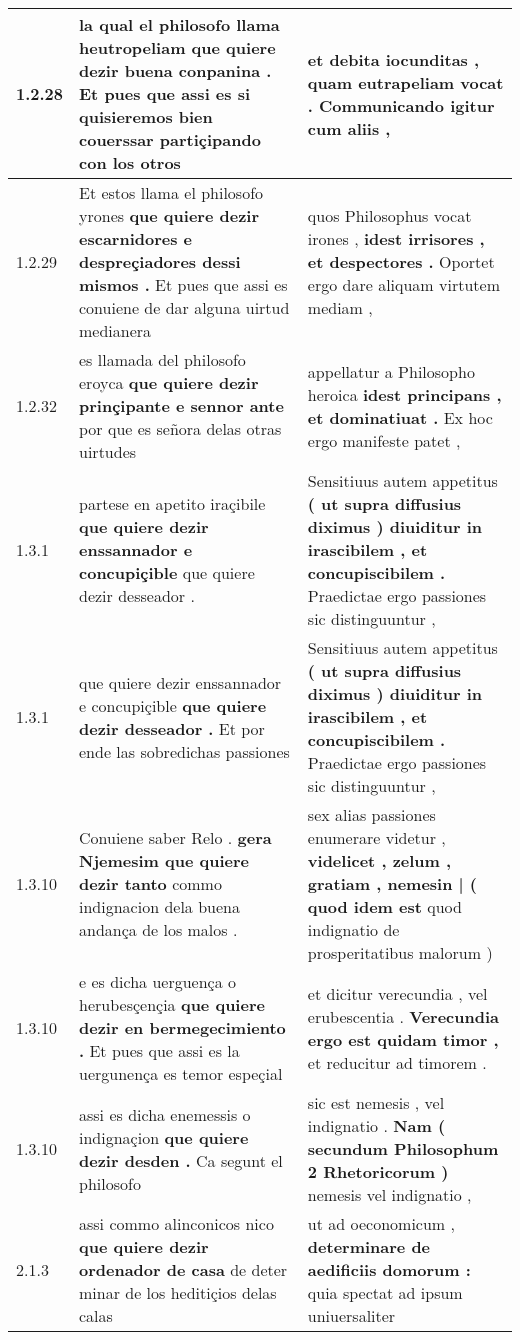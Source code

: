 \begin{tabular}{|p{1cm}|p{6.5cm}|p{6.5cm}|}
1.2.28 & la qual el philosofo llama heutropeliam \textbf{ que quiere dezir buena conpanina . } Et pues que assi es si quisieremos bien couerssar partiçipando con los otros & et debita iocunditas , \textbf{ quam eutrapeliam vocat . } Communicando igitur cum aliis , \\\hline
1.2.29 & Et estos llama el philosofo yrones \textbf{ que quiere dezir escarnidores e despreçiadores dessi mismos . } Et pues que assi es conuiene de dar alguna uirtud medianera & quos Philosophus vocat irones , \textbf{ idest irrisores , et despectores . } Oportet ergo dare aliquam virtutem mediam , \\\hline
1.2.32 & es llamada del philosofo eroyca \textbf{ que quiere dezir prinçipante e sennor ante } por que es señora delas otras uirtudes & appellatur a Philosopho heroica \textbf{ idest principans , et dominatiuat . } Ex hoc ergo manifeste patet , \\\hline
1.3.1 & partese en apetito iraçibile \textbf{ que quiere dezir enssannador e concupiçible } que quiere dezir desseador . & Sensitiuus autem appetitus \textbf{ ( ut supra diffusius diximus ) diuiditur in irascibilem , et concupiscibilem . } Praedictae ergo passiones sic distinguuntur , \\\hline
1.3.1 & que quiere dezir enssannador e concupiçible \textbf{ que quiere dezir desseador . } Et por ende las sobredichas passiones & Sensitiuus autem appetitus \textbf{ ( ut supra diffusius diximus ) diuiditur in irascibilem , et concupiscibilem . } Praedictae ergo passiones sic distinguuntur , \\\hline
1.3.10 & Conuiene saber Relo . \textbf{ gera Njemesim que quiere dezir tanto } commo indignacion dela buena andança de los malos . & sex alias passiones enumerare videtur , \textbf{ videlicet , zelum , gratiam , nemesin | ( quod idem est } quod indignatio de prosperitatibus malorum ) \\\hline
1.3.10 & e es dicha uerguença o herubesçençia \textbf{ que quiere dezir en bermegecimiento . } Et pues que assi es la uergunença es temor espeçial & et dicitur verecundia , vel erubescentia . \textbf{ Verecundia ergo est quidam timor , } et reducitur ad timorem . \\\hline
1.3.10 & assi es dicha enemessis o indignaçion \textbf{ que quiere dezir desden . } Ca segunt el philosofo & sic est nemesis , vel indignatio . \textbf{ Nam ( secundum Philosophum 2 Rhetoricorum ) } nemesis vel indignatio , \\\hline
2.1.3 & assi commo alinconicos nico \textbf{ que quiere dezir ordenador de casa } de deter minar de los heditiçios delas calas & ut ad oeconomicum , \textbf{ determinare de aedificiis domorum : } quia spectat ad ipsum uniuersaliter \\\hline

\end{tabular}
